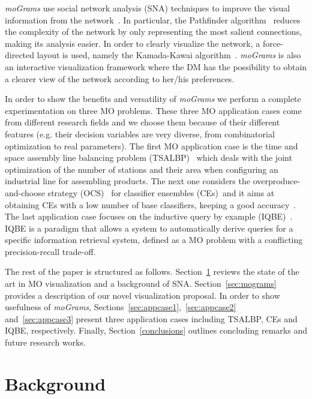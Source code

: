 \documentclass[journal]{IEEEtran}
\begin{document}
\emph{moGrams} use social network analysis (SNA) techniques to improve the visual information from the network~\cite{Scott2000,wasserman1994social}.
In particular, the Pathfinder algorithm~\cite{Dearholt90,Sch89} reduces the complexity of the network by only representing the most salient connections, making its analysis easier. 
In order to clearly visualize the network, a force-directed layout is used, namely the Kamada-Kawai algorithm~\cite{MoyaAnegon07}. \emph{moGrams} is also an interactive visualization framework where the DM has the possibility to obtain a clearer view of the network according to her/his preferences. 

In order to show the benefits and versatility of \emph{moGrams} we perform a complete experimentation on three MO problems. These three MO application cases come from different research fields and we choose them because of their different features (e.g. their decision variables are very diverse, from combinatorial optimization to real parameters). The first MO application case is the time and space assembly line balancing problem (TSALBP)~\cite{Chica10Ins,Chica11CAIE} which deals with the joint optimization of the number of stations and their area when configuring an industrial line for assembling products. The next one considers the overproduce-and-choose strategy (OCS)~\cite{Partridge96} for classifier ensembles (CEs)~\cite{Kun04}and it aims at obtaining CEs with a low number of base classifiers, keeping a good accuracy~\cite{Trawinski11,Trawinski2013}. The last application case focuses on the inductive query by example (IQBE)~\cite{Cordon2006}. IQBE is a paradigm that allows a system to automatically derive queries for a specific information retrieval system, defined as a MO problem with a conflicting precision-recall trade-off.

The rest of the paper is structured as follows. Section~\ref{sec:background} reviews the state of the art in MO visualization and a background of SNA. Section~\ref{sec:mograms} provides a description of our novel visualization proposal. In order to show usefulness of \emph{moGrams}, Sections~\ref{sec:appcase1},~\ref{sec:appcase2} and~\ref{sec:appcase3} present three application cases including TSALBP, CEs and IQBE, respectively. Finally, Section~\ref{conclusions} outlines concluding remarks and future research works.







\section{Background}
\label{sec:background}
\end{document}
